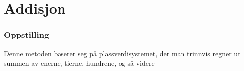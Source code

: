 



\section{Addisjon}

\subsubsection{Oppstilling}
Denne metoden baserer seg på plassverdisystemet, der man trinnvis regner ut summen av enerne, tierne, hundrene, og så videre
\begin{center}
	\parbox{0.3\linewidth}{
}\qquad
\parbox{0.3\linewidth}{
}\\[12pt]
\parbox{0.3\linewidth}{
}\qquad
\parbox{0.3\linewidth}{
}
\end{center}
